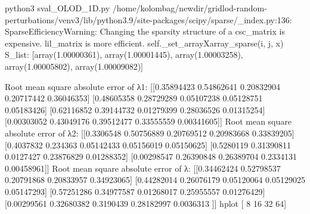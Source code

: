  python3 sval_OLOD_1D.py
/home/kolombag/newdir/gridlod-random-perturbations/venv3/lib/python3.9/site-packages/scipy/sparse/_index.py:136: SparseEfficiencyWarning: Changing the sparsity structure of a csc_matrix is expensive. lil_matrix is more efficient.
  self._set_arrayXarray_sparse(i, j, x)
S_list:
[array(1.00000361), array(1.00001445), array(1.00003258), array(1.00005802), array(1.00009082)]

Root mean square absolute error of λ1:
 [[0.35894423 0.54862641 0.20832904 0.20717442 0.36046353]
 [0.48605358 0.28729289 0.05107238 0.05128751 0.05183426]
 [0.62116852 0.39144732 0.01279399 0.28036526 0.01315254]
 [0.00303052 0.43049176 0.39512477 0.33555559 0.00341605]]
Root mean square absolute error of λ2: 
 [[0.3306548  0.50756889 0.20769512 0.20983668 0.33839205]
 [0.4037832  0.234363   0.05142433 0.05156019 0.05150625]
 [0.5280119  0.31390811 0.0127427  0.23876829 0.01288352]
 [0.00298547 0.26390848 0.26389704 0.2334131  0.00458961]]
Root mean square absolute error of λ: 
 [[0.34462424 0.52798537 0.20791868 0.20833957 0.34923065]
 [0.44282014 0.26076179 0.05120064 0.05129025 0.05147293]
 [0.57251286 0.34977587 0.01268017 0.25955557 0.01276429]
 [0.00299561 0.32680382 0.3190439  0.28182997 0.0036313 ]]
hplot [ 8 16 32 64]
